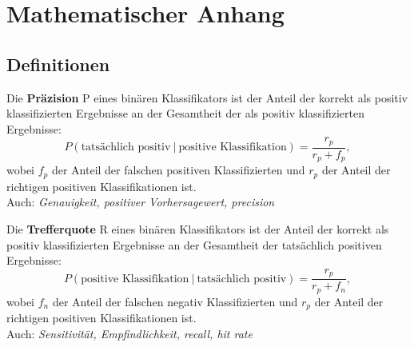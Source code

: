 \documentclass[
	a4paper,
	12pt,
	bibliography=totocnumbered,
	twoside,
]{scrreprt}
\begin{document}
\chapter{Mathematischer Anhang}


\section{Definitionen}
\label{sec:definitions}

\vspace{1.5cm}
\begin{Definition}[Präzision]
    Die \textbf{Präzision} P eines binären Klassifikators ist der Anteil der korrekt als positiv klassifizierten Ergebnisse an der Gesamtheit der als positiv klassifizierten Ergebnisse:
    \begin{equation}
        P(\text{tatsächlich \ positiv} \ | \ \text{positive \ Klassifikation}) = \frac{r_p}{r_p + f_p},
    \end{equation}
    wobei $f_p$ der Anteil der falschen positiven Klassifizierten und $r_p$ der Anteil der richtigen positiven Klassifikationen ist.\\
    
    Auch: \textit{Genauigkeit, positiver Vorhersagewert, precision}
\end{Definition}


\vspace{1.5cm}
\begin{Definition}[Trefferquote]
    Die \textbf{Trefferquote} R eines binären Klassifikators ist der Anteil der korrekt als positiv klassifizierten Ergebnisse an der Gesamtheit der tatsächlich positiven Ergebnisse:
    \begin{equation}
        P(\text{positive \ Klassifikation} \ | \ \text{tatsächlich \ positiv}) = \frac{r_p}{r_p + f_n},
    \end{equation}
    wobei $f_n$ der Anteil der falschen negativ Klassifizierten und $r_p$ der Anteil der richtigen positiven Klassifikationen ist.\\
    
    Auch: \textit{Sensitivität, Empfindlichkeit, recall, hit rate}
	\label{def:tq}
\end{Definition}
\end{document}
